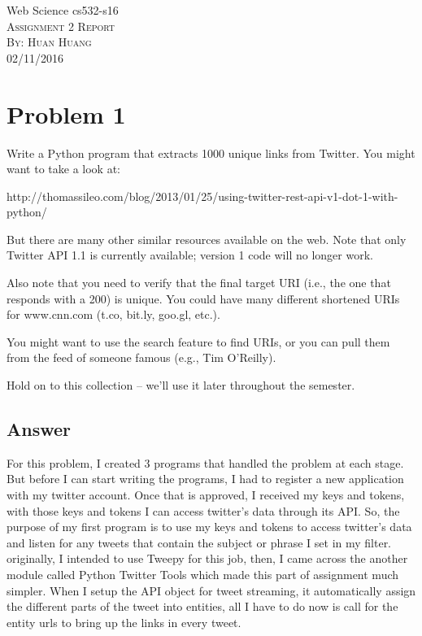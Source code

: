 \documentclass[12pt]{article}
\begin{document}
\begin{titlepage}
	\begin{center}
	\Huge{Web Science cs532-s16}\\
	[0.25in]
	\textsc{\Large Assignment 2 Report}\\
	[4.25in]
	\textsc{\normalsize By: Huan Huang}\\
	\large 02/11/2016\\
	
	
	\end{center}
\end{titlepage}
\newpage


\section*{Problem 1}
Write a Python program that extracts 1000 unique links from
Twitter.  You might want to take a look at:

\noindent
http://thomassileo.com/blog/2013/01/25/using-twitter-rest-api-v1-dot-1-with-python/

\noindent
But there are many other similar resources available on the web.  Note
that only Twitter API 1.1 is currently available; version 1 code will
no longer work.

\noindent
Also note that you need to verify that the final target URI (i.e., the
one that responds with a 200) is unique.  You could have many different
shortened URIs for www.cnn.com (t.co, bit.ly, goo.gl, etc.).

\noindent
You might want to use the search feature to find URIs, or you can
pull them from the feed of someone famous (e.g., Tim O'Reilly).

\noindent
Hold on to this collection -- we'll use it later throughout the semester.

\subsection*{Answer}
For this problem, I created 3 programs that handled the problem at each stage. But before I can start writing the programs, I had to register a new application with my twitter account. Once that is approved, I received my keys and tokens, with those keys and tokens I can access twitter's data through its API. So, the purpose of my first program is to use my keys and tokens to access twitter's data and listen for any tweets that contain the subject or phrase I set in my filter. originally, I intended to use Tweepy for this job, then, I came across the another module called Python Twitter Tools which made this part of assignment much simpler. When I setup the API object for tweet streaming, it automatically assign the different parts of the tweet into entities, all I have to do now is call for the entity urls to bring up the links in every tweet. 
\end{document}

